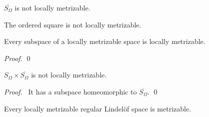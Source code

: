 \begin{cor}
 $\overline{S_\Omega}$ is not locally metrizable.
\end{cor}

\begin{cor}
The ordered square is not locally metrizable.
\end{cor}

\begin{prop}
Every subspace of a locally metrizable space is locally metrizable.
\end{prop}

\begin{proof}
\pf
{}
\qed
\end{proof}

\begin{cor}
$S_\Omega \times \overline{S_\Omega}$ is not locally metrizable.
\end{cor}

\begin{proof}
\pf\ It has a subspace homeomorphic to $\overline{S_\Omega}$. \qed
\end{proof}

\begin{prop}[CC]
 Every locally metrizable regular Lindel\"{o}f space is metrizable.
\end{prop}

